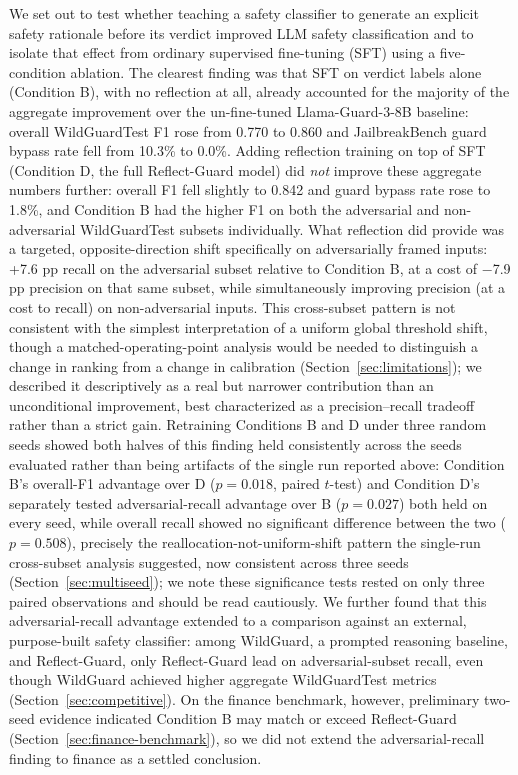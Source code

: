 \documentclass[superintelligence,article,accept,moreauthors]{Definitions/mdpi}
\begin{document}
We set out to test whether teaching a safety classifier to generate an explicit safety rationale before its verdict improved LLM safety classification and to isolate that effect from ordinary supervised fine-tuning (SFT) using a five-condition ablation. The clearest finding was that SFT on verdict labels alone (Condition B), with no reflection at all, already accounted for the majority of the aggregate improvement over the un-fine-tuned Llama-Guard-3-8B baseline: overall WildGuardTest F1 rose from 0.770 to 0.860 and JailbreakBench guard bypass rate fell from 10.3\% to 0.0\%. Adding reflection training on top of SFT (Condition D, the full Reflect-Guard model) did \emph{not} improve these aggregate numbers further: overall F1 fell slightly to 0.842 and guard bypass rate rose to 1.8\%, and Condition B had the higher F1 on both the adversarial and non-adversarial WildGuardTest subsets individually. What reflection did provide was a targeted, opposite-direction shift specifically on adversarially framed inputs: +7.6 pp recall on the adversarial subset relative to Condition B, at a cost of $-$7.9 pp precision on that same subset, while simultaneously improving precision (at a cost to recall) on non-adversarial inputs. This cross-subset pattern is not consistent with the simplest interpretation of a uniform global threshold shift, though a matched-operating-point analysis would be needed to distinguish a change in ranking from a change in calibration (Section~\ref{sec:limitations}); we described it descriptively as a real but narrower contribution than an unconditional improvement, best characterized as a precision--recall tradeoff rather than a strict gain. Retraining Conditions B and D under three random seeds showed both halves of this finding held consistently across the seeds evaluated rather than being artifacts of the single run reported above: Condition B's overall-F1 advantage over D ($p=0.018$, paired $t$-test) and Condition D's separately tested adversarial-recall advantage over B \mbox{($p=0.027$)} both held on every seed, while overall recall showed no significant difference between the two ($p=0.508$), precisely the reallocation-not-uniform-shift pattern the single-run cross-subset analysis suggested, now consistent across three seeds (Section~\ref{sec:multiseed}); we note these significance tests rested on only three paired observations and should be read cautiously. We further found that this adversarial-recall advantage extended to a comparison against an external, purpose-built safety classifier: among WildGuard, a prompted reasoning baseline, and Reflect-Guard, only Reflect-Guard lead on adversarial-subset recall, even though WildGuard achieved higher aggregate WildGuardTest metrics (Section~\ref{sec:competitive}). On the finance benchmark, however, preliminary two-seed evidence indicated Condition B may match or exceed Reflect-Guard (Section~\ref{sec:finance-benchmark}), so we did not extend the adversarial-recall finding to finance as a settled conclusion.
\end{document}
